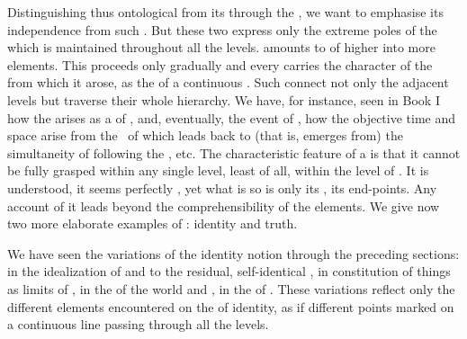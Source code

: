 Distinguishing thus ontological  from its 
through the , we want to emphasise its independence from such
. But these two express only the extreme poles of the  which is 
maintained throughout all the levels. 
% 
%
 amounts to  of higher  into more
 elements.  This  proceeds only gradually and every
 carries the character of the  from which it
arose, as the  of a continuous . Such 
connect not only the adjacent levels but traverse their whole hierarchy. We
have, for instance, seen in Book I how the  arises as
a  of ,  and, eventually, the event of
, how the objective time and space arise from the \nexus\ of
 which leads back to (that is, emerges from) the
 simultaneity of  following the , etc. The characteristic feature of a  is that it cannot
be fully grasped within any single level, least of all, within the level of
.  It is  understood, it seems perfectly
, yet what is so  is only its , its
end-points. Any account of it leads beyond the comprehensibility of the
 elements.  We give now two more elaborate examples of :
identity and truth.

\label{sub:Identity}
We have seen the variations of the identity notion  through the
preceding sections: in the idealization of  and  to
the residual, self-identical , in constitution of things as
limits of , in the  
  {of the world} and , in the  of . 
These variations reflect only the different elements encountered on the
 of identity, as if different points marked on a continuous line
passing through all the levels. 
  
